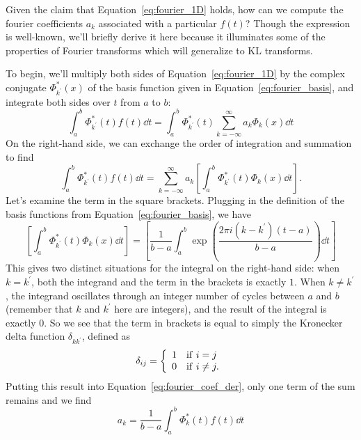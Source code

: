 Given the claim that Equation~\ref{eq:fourier_1D} holds, how can we
compute the fourier coefficients $a_k$ associated with 
a particular $f(t)$?  Though the expression is well-known, we'll briefly
derive it here because it illuminates some of the properties of
Fourier transforms which will generalize to KL transforms.

To begin, we'll multiply both sides of Equation~\ref{eq:fourier_1D} by the
complex conjugate $\Phi^\ast_{k^\prime}(x)$ of the basis function given
in Equation~\ref{eq:fourier_basis}, and integrate both sides over $t$
from $a$ to $b$:
\begin{equation}
  \int_a^b \Phi^\ast_{k^\prime}(t) f(t) \dd t
  = \int_a^b \Phi^\ast_{k^\prime}(t) \sum_{k=-\infty}^\infty a_k\Phi_k(x)\dd t
\end{equation}
On the right-hand side, we can exchange the order of integration and
summation to find 
\begin{equation}
  \label{eq:fourier_coef_der}
  \int_a^b \Phi^\ast_{k^\prime}(t) f(t) \dd t
  =  \sum_{k=-\infty}^\infty a_k \left[\int_a^b \Phi^\ast_{k^\prime}(t)\Phi_k(x)\dd t\right].
\end{equation}
Let's examine the term in the square brackets.  Plugging in the definition
of the basis functions from Equation~\ref{eq:fourier_basis}, we have
\begin{equation}
  \left[\int_a^b \Phi^\ast_{k^\prime}(t)\Phi_k(x)\dd t\right]
  = \left[\frac{1}{b-a}\int_a^b \exp\left(\frac{2\pi i (k - k^\prime) (t-a)}
    {b - a}\right)\dd t\right]
\end{equation}
This gives two distinct situations for the integral on the right-hand side:
when $k=k^\prime$, both the integrand 
and the term in the brackets is exactly $1$.  When $k\ne k^\prime$,
the integrand oscillates through an integer number of cycles between
$a$ and $b$ (remember that $k$ and $k^\prime$ here are integers),
and the result of the integral is exactly $0$.
So we see that the term in brackets is equal to simply 
the Kronecker delta function $\delta_{kk^\prime}$, defined as
\begin{equation}
  \delta_{ij} = \left\{
  \begin{array}{ll}
    1 & {\rm if}\ i = j\\
    0 & {\rm if}\ i \ne j.
  \end{array}
  \right.
\end{equation}
Putting this result into Equation~\ref{eq:fourier_coef_der}, only one
term of the sum remains and we find
\begin{equation}
  \label{eq:fourier_coef}
  a_k = \frac{1}{b - a}\int_a^b \Phi^\ast_k(t) f(t) \dd t
\end{equation}

